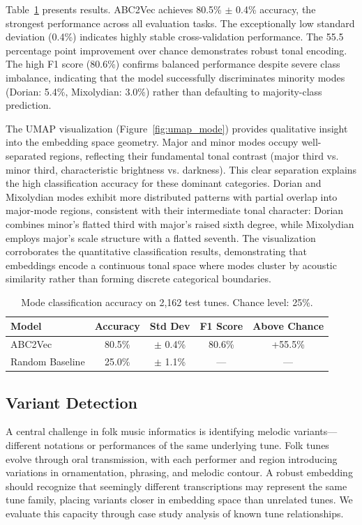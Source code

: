 \documentclass[]{interact}
\theoremstyle{plain}
\theoremstyle{definition}
\theoremstyle{remark}
\begin{document}
Table~\ref{tab:mode} presents results. ABC2Vec achieves 80.5\% $\pm$ 0.4\% accuracy, the strongest performance across all evaluation tasks. The exceptionally low standard deviation (0.4\%) indicates highly stable cross-validation performance. The 55.5 percentage point improvement over chance demonstrates robust tonal encoding. The high F1 score (80.6\%) confirms balanced performance despite severe class imbalance, indicating that the model successfully discriminates minority modes (Dorian: 5.4\%, Mixolydian: 3.0\%) rather than defaulting to majority-class prediction.

The UMAP visualization (Figure~\ref{fig:umap_mode}) provides qualitative insight into the embedding space geometry. Major and minor modes occupy well-separated regions, reflecting their fundamental tonal contrast (major third vs. minor third, characteristic brightness vs. darkness). This clear separation explains the high classification accuracy for these dominant categories. Dorian and Mixolydian modes exhibit more distributed patterns with partial overlap into major-mode regions, consistent with their intermediate tonal character: Dorian combines minor's flatted third with major's raised sixth degree, while Mixolydian employs major's scale structure with a flatted seventh. The visualization corroborates the quantitative classification results, demonstrating that embeddings encode a continuous tonal space where modes cluster by acoustic similarity rather than forming discrete categorical boundaries.

\begin{table}[!htb]
\centering
\caption{Mode classification accuracy on 2,162 test tunes. Chance level: 25\%.}
\label{tab:mode}
\begin{tabular}{lcccc}
\toprule
\textbf{Model} & \textbf{Accuracy} & \textbf{Std Dev} & \textbf{F1 Score} & \textbf{Above Chance} \\
\midrule
ABC2Vec & 80.5\% & $\pm$ 0.4\% & 80.6\% & +55.5\% \\
Random Baseline & 25.0\% & $\pm$ 1.1\% & --- & --- \\
\bottomrule
\end{tabular}
\end{table}

\subsection{Variant Detection}

A central challenge in folk music informatics is identifying melodic variants---different notations or performances of the same underlying tune. Folk tunes evolve through oral transmission, with each performer and region introducing variations in ornamentation, phrasing, and melodic contour. A robust embedding should recognize that seemingly different transcriptions may represent the same tune family, placing variants closer in embedding space than unrelated tunes. We evaluate this capacity through case study analysis of known tune relationships.
\end{document}
